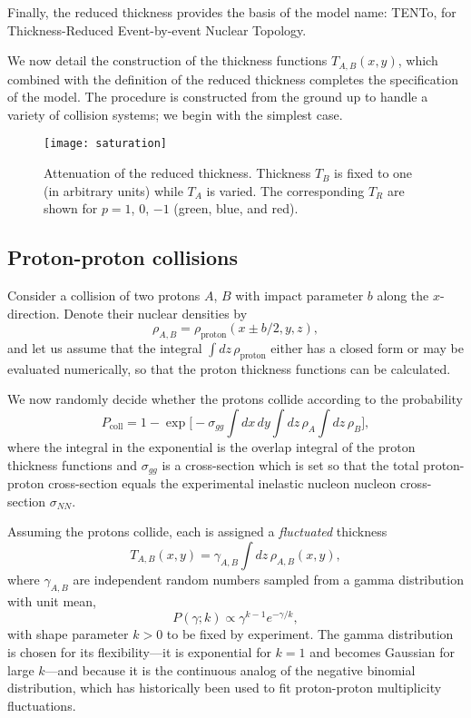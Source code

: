 \documentclass[aps,prl,reprint,amsmath,nofootinbib]{revtex4-1}
\newcommand{\trento}{T\raisebox{-.5ex}{R}ENTo}
\begin{document}
Finally, the reduced thickness provides the basis of the model name:
\trento, for Thickness-Reduced Event-by-event Nuclear Topology.

We now detail the construction of the thickness functions $T_{A,B}(x, y)$, which combined with the definition
of the reduced thickness completes the specification of the model.  The procedure is constructed from the
ground up to handle a variety of collision systems; we begin with the simplest case.

\begin{figure}[t]
  \texttt{[image: saturation]}
  \caption{
    \label{fig:saturation}
    Attenuation of the reduced thickness.  Thickness $T_B$ is fixed to one (in arbitrary units) while $T_A$ is
    varied.  The corresponding $T_R$ are shown for $p = 1$, 0, $-1$ (green, blue, and red).
  }
\end{figure}

\subsection{Proton-proton collisions}

Consider a collision of two protons $A$, $B$ with impact parameter $b$ along the $x$-direction.
Denote their nuclear densities by
\begin{equation}
  \rho_{A,B} = \rho_\text{proton}(x \pm b/2, y, z),
\end{equation}
and let us assume that the integral $\int dz \, \rho_\text{proton}$ either has a closed form or may be
evaluated numerically, so that the proton thickness functions can be calculated.

We now randomly decide whether the protons collide according to the probability \cite{proton-proton}
\begin{equation}
  P_\text{coll} = 1 - \exp\biggl[ -\sigma_{gg} \int dx \, dy \int dz \, \rho_A \int dz \, \rho_B \biggr],
  \label{eq:pcoll}
\end{equation}
where the integral in the exponential is the overlap integral of the proton thickness functions and
$\sigma_{gg}$ is a cross-section which is set so that the total proton-proton cross-section equals the
experimental inelastic nucleon nucleon cross-section $\sigma_{NN}$.

Assuming the protons collide, each is assigned a \emph{fluctuated} thickness
\begin{equation}
  T_{A,B}(x, y) = \gamma_{A,B} \int dz \, \rho_{A,B}(x, y),
\end{equation}
where $\gamma_{A,B}$ are independent random numbers sampled from a gamma distribution with unit mean,
\begin{equation}
  P(\gamma; k) \propto \gamma^{k-1} e^{-\gamma/k},
\end{equation}
with shape parameter $k > 0$ to be fixed by experiment.  The gamma distribution is chosen for its
flexibility---it is exponential for $k = 1$ and becomes Gaussian for large $k$---and because it is the
continuous analog of the negative binomial distribution, which has historically been used to fit proton-proton
multiplicity fluctuations.
\end{document}

